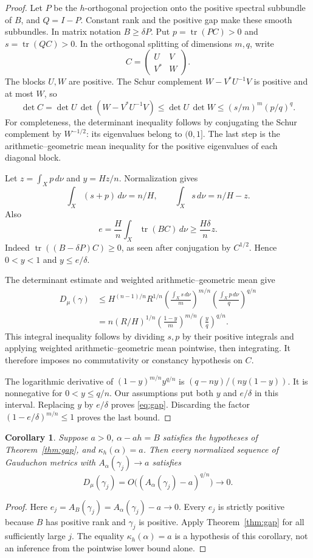 \documentclass[11pt]{article}
\newtheorem{corollary}[theorem]{Corollary}
\newcommand{\tr}{\operatorname{tr}}
\begin{document}
\begin{proof}
Let \(P\) be the \(h\)-orthogonal projection onto the positive spectral
subbundle of \(B\), and \(Q=I-P\). Constant rank and the positive gap make
these smooth subbundles. In matrix notation \(B\geq\delta P\).
Put \(p=\tr(PC)>0\) and \(s=\tr(QC)>0\).
In the orthogonal splitting of dimensions \(m,q\), write
\[
 C=\begin{pmatrix}U&V\\V^*&W\end{pmatrix}.
\]
The blocks \(U,W\) are positive. The Schur complement
\(W-V^*U^{-1}V\) is positive and at most \(W\), so
\[
 \det C
 =\det U\,\det(W-V^*U^{-1}V)
 \leq\det U\,\det W
 \leq (s/m)^m(p/q)^q.
\]
For completeness, the determinant inequality follows by conjugating
the Schur complement by \(W^{-1/2}\): its eigenvalues belong to \((0,1]\).
The last step is the arithmetic--geometric mean inequality for the
positive eigenvalues of each diagonal block.

Let \(z=\int_Xp\,d\nu\) and \(y=Hz/n\). Normalization gives
\[
 \int_X(s+p)\,d\nu=n/H,\qquad
 \int_Xs\,d\nu=n/H-z.
\]
Also
\[
 e=\frac Hn\int_X\tr(BC)\,d\nu\geq\frac{H\delta}{n}z.
\]
Indeed \(\tr((B-\delta P)C)\geq0\), as seen after conjugation by
\(C^{1/2}\). Hence \(0<y<1\) and \(y\leq e/\delta\).

The determinant estimate and weighted arithmetic--geometric mean give
\begin{align*}
 D_\mu(\gamma)
 &\leq H^{(n-1)/n}R^{1/n}
       \left(\frac{\int_Xs\,d\nu}{m}\right)^{m/n}
       \left(\frac{\int_Xp\,d\nu}{q}\right)^{q/n}\\
 &=n(R/H)^{1/n}
       \left(\frac{1-y}{m}\right)^{m/n}
       \left(\frac yq\right)^{q/n}.
\end{align*}
This integral inequality follows by dividing \(s,p\) by their positive
integrals and applying weighted arithmetic--geometric mean pointwise,
then integrating. It therefore imposes no commutativity or constancy
hypothesis on \(C\).

The logarithmic derivative of
\((1-y)^{m/n}y^{q/n}\) is
\((q-ny)/(ny(1-y))\). It is nonnegative for \(0<y\leq q/n\).
Our assumptions put both \(y\) and \(e/\delta\) in this interval.
Replacing \(y\) by \(e/\delta\) proves \eqref{eq:gap}.
Discarding the factor \((1-e/\delta)^{m/n}\leq1\) proves the last bound.
\end{proof}

\begin{corollary}\label{cor:sequence}
Suppose \(a>0\), \(\alpha-a h=B\) satisfies the hypotheses of
Theorem~\ref{thm:gap}, and \(\kappa_h(\alpha)=a\).
Then every normalized sequence of Gauduchon metrics with
\(A_\alpha(\gamma_j)\to a\) satisfies
\[
 D_\mu(\gamma_j)=
 O\bigl((A_\alpha(\gamma_j)-a)^{q/n}\bigr)\longrightarrow0.
\]
\end{corollary}
\begin{proof}
Here \(e_j=A_B(\gamma_j)=A_\alpha(\gamma_j)-a\to0\).
Every \(e_j\) is strictly positive because \(B\) has positive rank and
\(\gamma_j\) is positive. Apply Theorem~\ref{thm:gap} for all sufficiently
large \(j\). The equality \(\kappa_h(\alpha)=a\) is a hypothesis of this
corollary, not an inference from the pointwise lower bound alone.
\end{proof}
\end{document}
